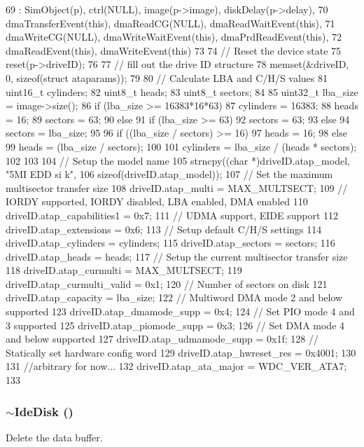 \begin{DoxyCode}
69     : SimObject(p), ctrl(NULL), image(p->image), diskDelay(p->delay),
70       dmaTransferEvent(this), dmaReadCG(NULL), dmaReadWaitEvent(this),
71       dmaWriteCG(NULL), dmaWriteWaitEvent(this), dmaPrdReadEvent(this),
72       dmaReadEvent(this), dmaWriteEvent(this)
73 {
74     // Reset the device state
75     reset(p->driveID);
76 
77     // fill out the drive ID structure
78     memset(&driveID, 0, sizeof(struct ataparams));
79 
80     // Calculate LBA and C/H/S values
81     uint16_t cylinders;
82     uint8_t heads;
83     uint8_t sectors;
84 
85     uint32_t lba_size = image->size();
86     if (lba_size >= 16383*16*63) {
87         cylinders = 16383;
88         heads = 16;
89         sectors = 63;
90     } else {
91         if (lba_size >= 63)
92             sectors = 63;
93         else
94             sectors = lba_size;
95 
96         if ((lba_size / sectors) >= 16)
97             heads = 16;
98         else
99             heads = (lba_size / sectors);
100 
101         cylinders = lba_size / (heads * sectors);
102     }
103 
104     // Setup the model name
105     strncpy((char *)driveID.atap_model, "5MI EDD si k",
106             sizeof(driveID.atap_model));
107     // Set the maximum multisector transfer size
108     driveID.atap_multi = MAX_MULTSECT;
109     // IORDY supported, IORDY disabled, LBA enabled, DMA enabled
110     driveID.atap_capabilities1 = 0x7;
111     // UDMA support, EIDE support
112     driveID.atap_extensions = 0x6;
113     // Setup default C/H/S settings
114     driveID.atap_cylinders = cylinders;
115     driveID.atap_sectors = sectors;
116     driveID.atap_heads = heads;
117     // Setup the current multisector transfer size
118     driveID.atap_curmulti = MAX_MULTSECT;
119     driveID.atap_curmulti_valid = 0x1;
120     // Number of sectors on disk
121     driveID.atap_capacity = lba_size;
122     // Multiword DMA mode 2 and below supported
123     driveID.atap_dmamode_supp = 0x4;
124     // Set PIO mode 4 and 3 supported
125     driveID.atap_piomode_supp = 0x3;
126     // Set DMA mode 4 and below supported
127     driveID.atap_udmamode_supp = 0x1f;
128     // Statically set hardware config word
129     driveID.atap_hwreset_res = 0x4001;
130 
131     //arbitrary for now...
132     driveID.atap_ata_major = WDC_VER_ATA7;
133 }
\end{DoxyCode}
\hypertarget{classIdeDisk_ad8843ac1fd1bc4b6d82e57318c9aeb38}{
\subsubsection[{$\sim$IdeDisk}]{\setlength{\rightskip}{0pt plus 5cm}$\sim${\bf IdeDisk} ()}}
\label{classIdeDisk_ad8843ac1fd1bc4b6d82e57318c9aeb38}
Delete the data buffer. 



